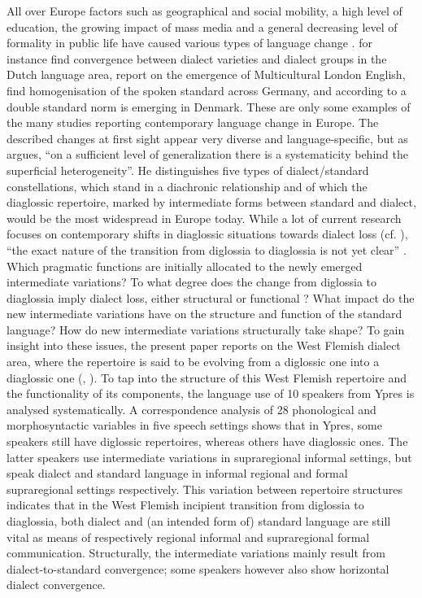 \documentclass[output=paper]{LSP/langsci}
\begin{document}
All over Europe factors such as geographical and social mobility, a high level of education, the growing impact of mass media and a general decreasing level of formality in public life have caused various types of language change \citep[355]{taeldeman_linguistic_2009}. \citet{heeringa_convergence_2014} for instance find convergence between dialect varieties and dialect groups in the Dutch language area, \citet{cheshire_contact_2011} report on the emergence of Multicultural London English, \citet{auer_demotisation_2011} find homogenisation of the spoken standard across Germany, and according to \citet{kristiansen_two_2001} a double standard norm is emerging in Denmark. These are only some examples of the many studies reporting contemporary language change in Europe. The described changes at first sight appear very diverse and language-specific, but as \citet[7]{auer_europes_2005} argues, “on a sufficient level of generalization there is a systematicity behind the superficial heterogeneity”. He distinguishes five types of dialect/standard constellations, which stand in a diachronic relationship and of which the diaglossic repertoire, marked by intermediate forms between standard and dialect, would be the most widespread in Europe today. While a lot of current research focuses on contemporary shifts in diaglossic situations towards dialect loss (cf. \citealt{ghyselen_impact_2013,grondelaers_standard_2011,vandekerckhove_dialect_2009}), “the exact nature of the transition from diglossia to diaglossia is not yet clear” \citep[23]{auer_europes_2005}. Which pragmatic functions are initially allocated to the newly emerged intermediate variations? To what degree does the change from diglossia to diaglossia imply dialect loss, either structural or functional \citep{auer_convergence_1996}? What impact do the new intermediate variations have on the structure and function of the standard language? How do new intermediate variations structurally take shape? To gain insight into these issues, the present paper reports on the West Flemish dialect area, where the repertoire is said to be evolving from a diglossic one into a diaglossic one (\citealt{de_caluwe_tussentaal_2009}, \citealt[272]{willemyns_-standardization_2007}). To tap into the structure of this West Flemish repertoire and the functionality of its components, the language use of 10 speakers from Ypres is analysed systematically. A correspondence analysis of 28 phonological and morphosyntactic variables in five speech settings shows that in Ypres, some speakers still have diglossic repertoires, whereas others have diaglossic ones. The latter speakers use intermediate variations in supraregional informal settings, but speak dialect and standard language in informal regional and formal supraregional settings respectively. This variation between repertoire structures indicates that in the West Flemish incipient transition from diglossia to diaglossia, both dialect and (an intended form of) standard language are still vital as means of respectively regional informal and supraregional formal communication. Structurally, the intermediate variations mainly result from dialect-to-standard convergence; some speakers however also show horizontal dialect convergence.
\end{document}
